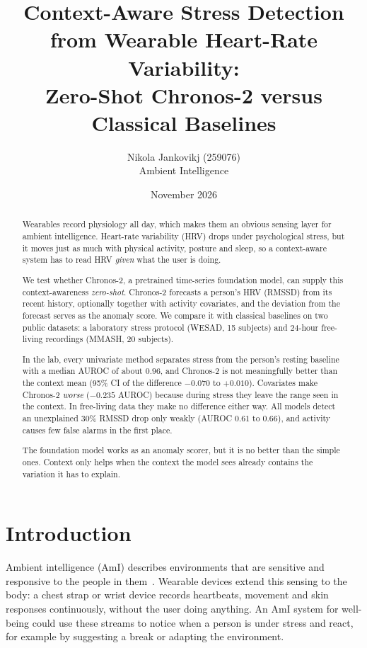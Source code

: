 \documentclass[11pt,a4paper]{article}
\title{Context-Aware Stress Detection from Wearable Heart-Rate Variability:\\
Zero-Shot Chronos-2 versus Classical Baselines}
\author{Nikola Jankovikj (259076)\\[2pt]\small Ambient Intelligence}
\date{November 2026}
\begin{document}
\maketitle

\begin{abstract}
Wearables record physiology all day, which makes them an obvious sensing layer for ambient intelligence. Heart-rate variability (HRV) drops under psychological stress, but it moves just as much with physical activity, posture and sleep, so a context-aware system has to read HRV \emph{given} what the user is doing.

We test whether Chronos-2, a pretrained time-series foundation model, can supply this context-awareness \emph{zero-shot}. Chronos-2 forecasts a person's HRV (RMSSD) from its recent history, optionally together with activity covariates, and the deviation from the forecast serves as the anomaly score. We compare it with classical baselines on two public datasets: a laboratory stress protocol (WESAD, 15 subjects) and 24-hour free-living recordings (MMASH, 20 subjects).

In the lab, every univariate method separates stress from the person's resting baseline with a median AUROC of about $0.96$, and Chronos-2 is not meaningfully better than the context mean (95\% CI of the difference $-0.070$ to $+0.010$). Covariates make Chronos-2 \emph{worse} ($-0.235$ AUROC) because during stress they leave the range seen in the context. In free-living data they make no difference either way. All models detect an unexplained 30\% RMSSD drop only weakly (AUROC $0.61$ to $0.66$), and activity causes few false alarms in the first place.

The foundation model works as an anomaly scorer, but it is no better than the simple ones. Context only helps when the context the model sees already contains the variation it has to explain.
\end{abstract}

\section{Introduction}

Ambient intelligence (AmI) describes environments that are sensitive and responsive to the people in them~\cite{cook2009ami}. Wearable devices extend this sensing to the body: a chest strap or wrist device records heartbeats, movement and skin responses continuously, without the user doing anything. An AmI system for well-being could use these streams to notice when a person is under stress and react, for example by suggesting a break or adapting the environment.
\end{document}
